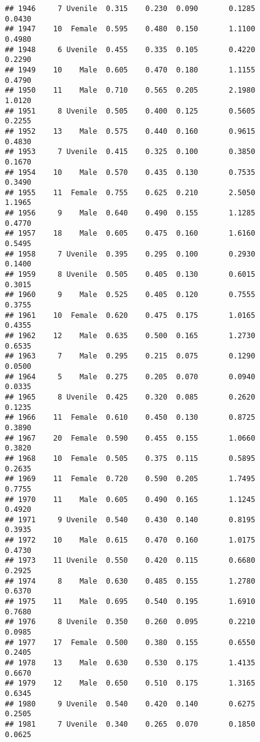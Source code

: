 \documentclass[
]{article}
\begin{document}
\begin{verbatim}
## 1946     7 Uvenile  0.315    0.230  0.090       0.1285         0.0430
## 1947    10  Female  0.595    0.480  0.150       1.1100         0.4980
## 1948     6 Uvenile  0.455    0.335  0.105       0.4220         0.2290
## 1949    10    Male  0.605    0.470  0.180       1.1155         0.4790
## 1950    11    Male  0.710    0.565  0.205       2.1980         1.0120
## 1951     8 Uvenile  0.505    0.400  0.125       0.5605         0.2255
## 1952    13    Male  0.575    0.440  0.160       0.9615         0.4830
## 1953     7 Uvenile  0.415    0.325  0.100       0.3850         0.1670
## 1954    10    Male  0.570    0.435  0.130       0.7535         0.3490
## 1955    11  Female  0.755    0.625  0.210       2.5050         1.1965
## 1956     9    Male  0.640    0.490  0.155       1.1285         0.4770
## 1957    18    Male  0.605    0.475  0.160       1.6160         0.5495
## 1958     7 Uvenile  0.395    0.295  0.100       0.2930         0.1400
## 1959     8 Uvenile  0.505    0.405  0.130       0.6015         0.3015
## 1960     9    Male  0.525    0.405  0.120       0.7555         0.3755
## 1961    10  Female  0.620    0.475  0.175       1.0165         0.4355
## 1962    12    Male  0.635    0.500  0.165       1.2730         0.6535
## 1963     7    Male  0.295    0.215  0.075       0.1290         0.0500
## 1964     5    Male  0.275    0.205  0.070       0.0940         0.0335
## 1965     8 Uvenile  0.425    0.320  0.085       0.2620         0.1235
## 1966    11  Female  0.610    0.450  0.130       0.8725         0.3890
## 1967    20  Female  0.590    0.455  0.155       1.0660         0.3820
## 1968    10  Female  0.505    0.375  0.115       0.5895         0.2635
## 1969    11  Female  0.720    0.590  0.205       1.7495         0.7755
## 1970    11    Male  0.605    0.490  0.165       1.1245         0.4920
## 1971     9 Uvenile  0.540    0.430  0.140       0.8195         0.3935
## 1972    10    Male  0.615    0.470  0.160       1.0175         0.4730
## 1973    11 Uvenile  0.550    0.420  0.115       0.6680         0.2925
## 1974     8    Male  0.630    0.485  0.155       1.2780         0.6370
## 1975    11    Male  0.695    0.540  0.195       1.6910         0.7680
## 1976     8 Uvenile  0.350    0.260  0.095       0.2210         0.0985
## 1977    17  Female  0.500    0.380  0.155       0.6550         0.2405
## 1978    13    Male  0.630    0.530  0.175       1.4135         0.6670
## 1979    12    Male  0.650    0.510  0.175       1.3165         0.6345
## 1980     9 Uvenile  0.540    0.420  0.140       0.6275         0.2505
## 1981     7 Uvenile  0.340    0.265  0.070       0.1850         0.0625

\end{verbatim}
\end{document}
